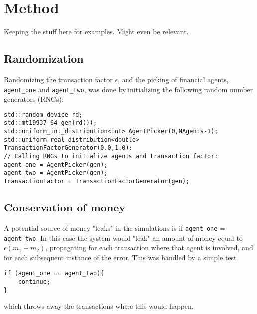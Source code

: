 \section{Method}
Keeping the stuff here for examples. Might even be relevant.
\subsection{Randomization}
Randomizing the transaction factor $\epsilon$, and the picking of financial agents,
\lstinline{agent_one} and \lstinline{agent_two}, was done by initializing the following
random number generators (RNGs):
\begin{lstlisting}
std::random_device rd;
std::mt19937_64 gen(rd());
std::uniform_int_distribution<int> AgentPicker(0,NAgents-1);
std::uniform_real_distribution<double> TransactionFactorGenerator(0.0,1.0);
// Calling RNGs to initialize agents and transaction factor:
agent_one = AgentPicker(gen);
agent_two = AgentPicker(gen);
TransactionFactor = TransactionFactorGenerator(gen);
\end{lstlisting}

\subsection{Conservation of money}
A potential source of money "leaks" in the simulations is if 
\lstinline{agent_one} = \lstinline{agent_two}.
In this case the system would "leak" an amount of money equal to $\epsilon(m_1+m_2)$, propagating
for each transaction where that agent is involved, and for each subsequent instance of the error.
This was handled by a simple test
\begin{lstlisting}
if (agent_one == agent_two){
    continue;
}
\end{lstlisting}
which throws away the transactions where this would happen.



